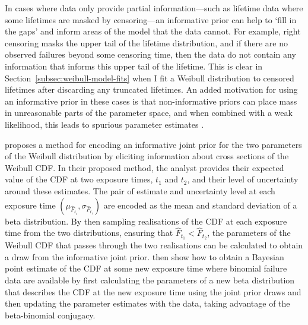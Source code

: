 In cases where data only provide partial information---such as lifetime data where some lifetimes are masked by censoring---an informative prior can help to `fill in the gaps' and inform areas of the model that the data cannot. For example, right censoring masks the upper tail of the lifetime distribution, and if there are no observed failures beyond some censoring time, then the data do not contain any information that informs this upper tail of the lifetime. This is clear in Section~\ref{subsec:weibull-model-fits} when I fit a Weibull distribution to censored lifetimes after discarding any truncated lifetimes. An added motivation for using an informative prior in these cases is that non-informative priors can place mass in unreasonable parts of the parameter space, and when combined with a weak likelihood, this leads to spurious parameter estimates \citep{tian2024}.

\citet{kaminskiy2005} proposes a method for encoding an informative joint prior for the two parameters of the Weibull distribution by eliciting information about cross sections of the Weibull CDF. In their proposed method, the analyst provides their expected value of the CDF at two exposure times, $t_1$ and $t_2$, and their level of uncertainty around these estimates. The pair of estimate and uncertainty level at each exposure time $(\mu_{\hat{F}_{t_i}}, \sigma_{\hat{F}_{t_i}})$ are encoded as the mean and standard deviation of a beta distribution. By then sampling realisations of the CDF at each exposure time from the two distributions, ensuring that $\hat{F}_{t_1} < \hat{F}_{t_2}$, the parameters of the Weibull CDF that passes through the two realisations can be calculated to obtain a draw from the informative joint prior. \citeauthor{kaminskiy2005} then show how to obtain a Bayesian point estimate of the CDF at some new exposure time where binomial failure data are available by first calculating the parameters of a new beta distribution that describes the CDF at the new exposure time using the joint prior draws and then updating the parameter estimates with the data, taking advantage of the beta-binomial conjugacy.

